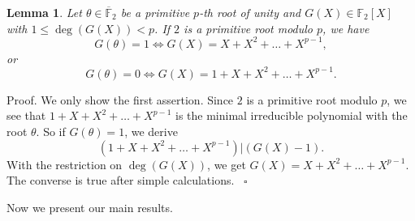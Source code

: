 \documentclass [11pt,a4paper]{article}
\def\F{\mathbb{F}}
\newtheorem{lemma}{Lemma}
\begin{document}
\begin{lemma}\label{lemma-p}
Let $\theta \in \overline{\mathbb{F}}_{2}$ be  a  primitive $p$-th root of
unity and $G(X)\in \F_2[X]$ with $1\le \deg(G(X))<p$. If  $2$ is a
primitive root modulo $p$, we have
$$
G(\theta)=1  \Longleftrightarrow G(X)=X+X^2+\ldots+X^{p-1},
$$
or
$$
G(\theta)=0  \Longleftrightarrow G(X)=1+X+X^2+\ldots+X^{p-1}.
$$
\end{lemma}
Proof. We only show the first assertion. Since $2$ is a
primitive root modulo $p$, we see that $1+X+X^2+\ldots+X^{p-1}$ is the minimal irreducible polynomial with the root $\theta$.
So if $G(\theta)=1$, we derive
$$
(1+X+X^2+\ldots+X^{p-1}) | (G(X)-1).
$$
With the restriction on $\deg(G(X))$, we get $G(X)=X+X^2+\ldots+X^{p-1}$. The converse is true after simple calculations.
~\hfill $\square$



Now we present our main results.
\end{document}
